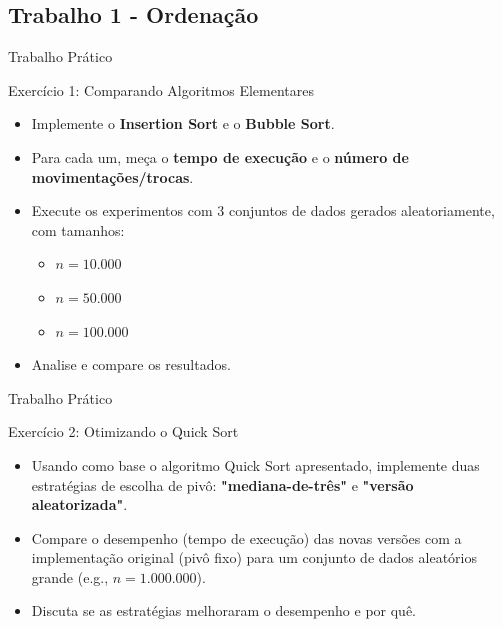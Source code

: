 \documentclass{beamer}
\begin{document}
\subsection{Trabalho 1 - Ordenação}
\begin{frame}{Trabalho Prático}
\begin{block}{Exercício 1: Comparando Algoritmos Elementares}
\begin{itemize}
 \item Implemente o \textbf{Insertion Sort} e o \textbf{Bubble Sort}.
 \item Para cada um, meça o \textbf{tempo de execução} e o \textbf{número de movimentações/trocas}.
 \item Execute os experimentos com 3 conjuntos de dados gerados aleatoriamente, com tamanhos:
 \begin{itemize}
 \item $n = 10.000$
 \item $n = 50.000$
 \item $n = 100.000$
 \end{itemize}
 \item Analise e compare os resultados.
\end{itemize}
\end{block}


\end{frame}

\begin{frame}{Trabalho Prático}


\begin{block}{Exercício 2: Otimizando o Quick Sort}
\begin{itemize}
 \item Usando como base o algoritmo Quick Sort apresentado, implemente duas estratégias de escolha de pivô: \textbf{"mediana-de-três"} e \textbf{"versão aleatorizada"}.
 \item Compare o desempenho (tempo de execução) das novas versões com a implementação original (pivô fixo) para um conjunto de dados aleatórios grande (e.g., $n = 1.000.000$).
 \item Discuta se as estratégias melhoraram o desempenho e por quê.
\end{itemize}
\end{block}
\end{frame}
\end{document}

